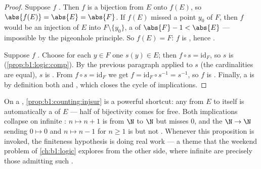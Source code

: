 \begin{proof}
Suppose $f$ . Then $f$ is a bijection from $E$ onto $f(E)$,
so $\abs{f(E)} = \abs{E} = \abs{F}$. If $f(E)$ missed a point $y_0$ of
$F$, then $f$ would be an injection of $E$ into $F \setminus \{y_0\}$,
a  of  $\abs{F} - 1 < \abs{E}$ --- impossible by the
pigeonhole principle. So $f(E) = F$: $f$ is , hence
.

Suppose $f$ . Choose for each $y \in F$ one  $s(y)
\in E$; then $f \circ s = \mathrm{id}_F$, so $s$ is 
(\cref{prop:b1:logic:comp}). By the previous paragraph applied to $s$
(the cardinalities are equal), $s$ is . From $f \circ s =
\mathrm{id}_F$ we get $f = \mathrm{id}_F \circ s^{-1} = s^{-1}$, so
$f$ is . Finally, a   is by definition both
 and , which closes the cycle of implications.
\end{proof}

\begin{example}\label{ex:b1:counting:finiteonly}
On a \emph{} , \cref{prop:b1:counting:injsur} is a powerful
shortcut: any   from $E$ to itself is automatically a
 of $E$ --- half of bijectivity comes for free. Both
implications collapse on infinite : $n \mapsto n + 1$ is
 from $\N$ to $\N$ but misses $0$, and the  $\N \to \N$
sending $0 \mapsto 0$ and $n \mapsto n - 1$ for $n \geq 1$ is
 but not . Whenever this proposition is invoked,
the finiteness hypothesis is doing real work --- a theme that the
weekend problem of \cref{ch:b1:logic} explores from the other side,
where infinite  are precisely those admitting such .
\end{example}

